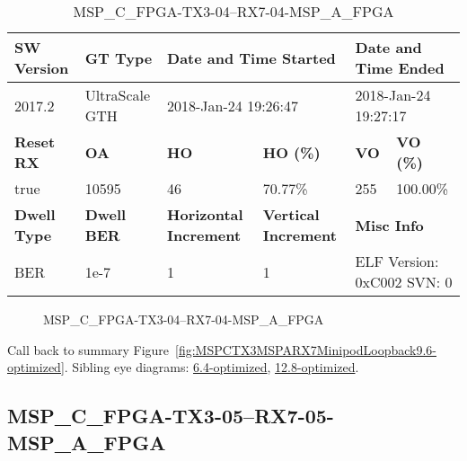\begin{table}[h]
\centering
\caption{MSP\_C\_FPGA-TX3-04--RX7-04-MSP\_A\_FPGA}
\label{tab:MSPCFPGATX304RX704MSPAFPGA9.6-optimized}
\begin{tabular}{@{}|l|l|l|l|l|l|@{}}
\toprule
\textbf{SW Version}                & \textbf{GT Type}   & \multicolumn{2}{l|}{\textbf{Date and Time Started}}            & \multicolumn{2}{l|}{\textbf{Date and Time Ended}}        \\ \midrule
2017.2                       & UltraScale GTH          & \multicolumn{2}{l|}{2018-Jan-24 19:26:47}                   & \multicolumn{2}{l|}{2018-Jan-24 19:27:17}               \\ \midrule
\textbf{Reset RX}                  & \textbf{OA} & \textbf{HO}   & \textbf{HO (\%)} & \textbf{VO} & \textbf{VO (\%)} \\ \midrule
true & 10595        & 46          & 70.77\%        & 255        & 100.00\%       \\ \midrule
\textbf{Dwell Type}                & \textbf{Dwell BER} & \textbf{Horizontal Increment} & \textbf{Vertical Increment}    & \multicolumn{2}{l|}{\textbf{Misc Info}}                  \\ \midrule
BER                            & 1e-7        & 1        & 1           & \multicolumn{2}{l|}{ELF Version: 0xC002 SVN: 0}                         \\ \bottomrule
\end{tabular}
\end{table}

\begin{figure}[h]
\caption{MSP\_C\_FPGA-TX3-04--RX7-04-MSP\_A\_FPGA} \label{fig:MSPCFPGATX304RX704MSPAFPGA9.6-optimized}
\end{figure}

Call back to summary Figure~\ref{fig:MSPCTX3MSPARX7MinipodLoopback9.6-optimized}.
Sibling eye diagrams: \hyperref[sec:MSPCFPGATX304RX704MSPAFPGA6.4-optimized]{6.4-optimized}, \hyperref[sec:MSPCFPGATX304RX704MSPAFPGA12.8-optimized]{12.8-optimized}.

\clearpage
\newpage


\subsection{MSP\_C\_FPGA-TX3-05--RX7-05-MSP\_A\_FPGA}\label{sec:MSPCFPGATX305RX705MSPAFPGA9.6-optimized}

